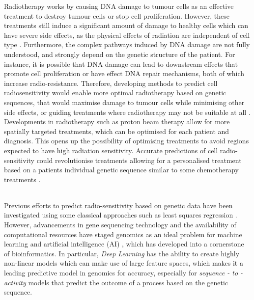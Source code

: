 \documentclass[NOTE, disdraft=true, UKenglish]{\DISCDTLATEXPATH UCLCDTDISdoc}
\begin{document}
Radiotherapy works by causing DNA damage to tumour cells as an effective treatment to destroy tumour cells or stop cell proliferation. However, these treatments still induce a significant amount of damage to healthy cells which can have severe side effects, as the physical effects of radiation are independent of cell type \cite{rev_radio}. Furthermore, the complex pathways induced by DNA damage are not fully understood, and strongly depend on the genetic structure of the patient. For instance, it is possible that DNA damage can lead to downstream effects that promote cell proliferation or have effect DNA repair mechanisms, both of which increase radio-resistance. Therefore, developing methods to predict cell radiosensitivity would enable more optimal radiotherapy based on genetic sequences, that would maximise damage to tumour cells while minimising other side effects, or guiding treatments where radiotherapy may not be suitable at all \cite{rev_radio}.  Developments in radiotherapy such as proton beam therapy \cite{proton_beam} allow for more spatially targeted treatments, which can be optimised for each patient and diagnosis. This opens up the possibility of optimising treatments to avoid regions expected to have high radiation sensitivity.  Accurate predictions of cell radio-sensitivity could revolutionise treatments allowing for a personalised treatment based on a patients individual genetic sequence similar to some chemotherapy treatments \cite{breast_cancer}.

\\ \indent 
Previous efforts to predict radio-sensitivity based on genetic data have been investigated using some classical approaches such as least squares regression \cite{rev_radio,SCOTT2017202}. 
However, advancements in gene sequencing technology and the availability of computational resources have staged genomics as an ideal problem for machine learning and artificial intelligence (AI) \cite{review}, which has developed into a cornerstone of bioinformatics. In particular, \textit{Deep Learning} has the ability to create highly non-linear models which can make use of large feature spaces, which makes it a leading predictive model in genomics for accuracy, especially for \textit{sequence - to - activity} models that predict the outcome of a process based on the genetic sequence. 
\end{document}
